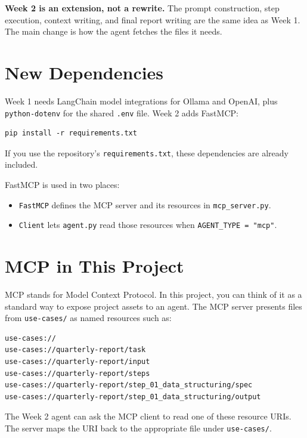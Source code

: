 \documentclass[12pt, a4paper]{article}
\begin{document}
\begin{notebox}
\textbf{Week 2 is an extension, not a rewrite.} The prompt construction, step execution, context writing, and final report writing are the same idea as Week 1. The main change is how the agent fetches the files it needs.
\end{notebox}

\section{New Dependencies}

Week 1 needs LangChain model integrations for Ollama and OpenAI, plus \texttt{python-dotenv} for the shared \texttt{.env} file. Week 2 adds FastMCP:

\begin{lstlisting}[style=shellstyle]
pip install -r requirements.txt
\end{lstlisting}

If you use the repository's \texttt{requirements.txt}, these dependencies are already included.

FastMCP is used in two places:

\begin{itemize}[leftmargin=1.5em]
  \item \texttt{FastMCP} defines the MCP server and its resources in \texttt{mcp\_server.py}.
  \item \texttt{Client} lets \texttt{agent.py} read those resources when \texttt{AGENT\_TYPE = "mcp"}.
\end{itemize}

\section{MCP in This Project}

MCP stands for Model Context Protocol. In this project, you can think of it as a standard way to expose project assets to an agent. The MCP server presents files from \texttt{use-cases/} as named resources such as:

\begin{lstlisting}[style=plainstyle]
use-cases://
use-cases://quarterly-report/task
use-cases://quarterly-report/input
use-cases://quarterly-report/steps
use-cases://quarterly-report/step_01_data_structuring/spec
use-cases://quarterly-report/step_01_data_structuring/output
\end{lstlisting}

The Week 2 agent can ask the MCP client to read one of these resource URIs. The server maps the URI back to the appropriate file under \texttt{use-cases/}.
\end{document}
